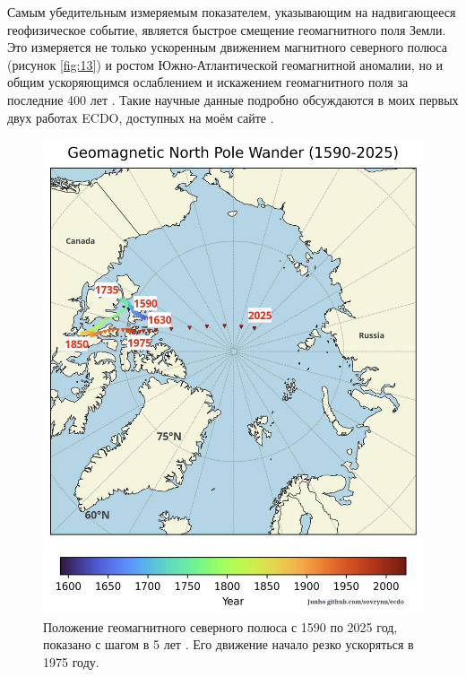 \documentclass[10pt,twocolumn,letterpaper]{article}
\begin{document}
Самым убедительным измеряемым показателем, указывающим на надвигающееся геофизическое событие, является быстрое смещение геомагнитного поля Земли. Это измеряется не только ускоренным движением магнитного северного полюса (рисунок \ref{fig:13}) и ростом Южно-Атлантической геомагнитной аномалии, но и общим ускоряющимся ослаблением и искажением геомагнитного поля за последние 400 лет \cite{3}. Такие научные данные подробно обсуждаются в моих первых двух работах ECDO, доступных на моём сайте \cite{3}.

\begin{figure}[t]
\begin{center}
   \includegraphics[width=1\linewidth]{npw.jpg}
\end{center}
   \caption{Положение геомагнитного северного полюса с 1590 по 2025 год, показано с шагом в 5 лет \cite{41}. Его движение начало резко ускоряться в 1975 году.}
\label{fig:13}
\label{fig:onecol}
\end{figure}
\end{document}
